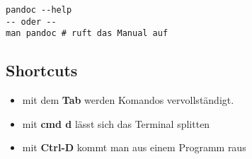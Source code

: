 \documentclass[]{article}
\begin{document}
\begin{verbatim}
pandoc --help
-- oder -- 
man pandoc # ruft das Manual auf
\end{verbatim}

\subsection{Shortcuts}\label{shortcuts}

\begin{itemize}
\itemsep1pt\parskip0pt
\item
  mit dem \textbf{Tab} werden Komandos vervollständigt.
\item
  mit \textbf{cmd d} lässt sich das Terminal splitten
\item
  mit \textbf{Ctrl-D} kommt man aus einem Programm raus
\end{itemize}
\end{document}
